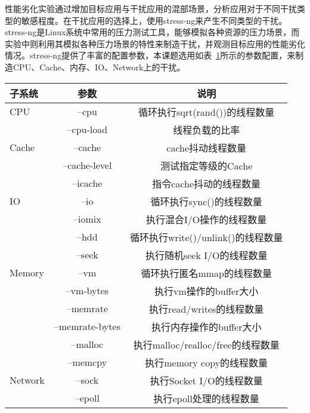 
性能劣化实验通过增加目标应用与干扰应用的混部场景，分析应用对于不同干扰类型的敏感程度。在干扰应用的选择上，使用stress-ng来产生不同类型的干扰。stress-ng是Linux系统中常用的压力测试工具，能够模拟各种资源的压力场景，而实验中则利用其模拟各种压力场景的特性来制造干扰，并观测目标应用的性能劣化情况。stress-ng提供了丰富的配置参数，本课题选用如表~\ref{tab:arg_list}所示的参数配置，来制造CPU、Cache、内存、IO、Network上的干扰。

\begin{table}
    \label{tab:arg_list}
    \footnotesize%
    \setlength{\tabcolsep}{4pt}%
    \renewcommand{\arraystretch}{1.5}%
    \centering
    \begin{tabular}{lcc}
        \hline
        子系统 & 参数 & 说明\\
        \hline
        CPU	    & --cpu & 循环执行sqrt(rand())的线程数量\\
	            & --cpu-load & 线程负载的比率\\
        Cache	& --cache & cache抖动线程数量\\
	            & --cache-level	&测试指定等级的Cache\\
	            & --icache	&指令cache抖动的线程数量\\
        IO	    & --io	&循环执行sync()的线程数量\\
	            & --iomix	&执行混合I/O操作的线程数量\\
	            & --hdd	&循环执行write()/unlink()的线程数量\\
	            & --seek	&执行随机seek I/O的线程数量\\
        Memory	& --vm	&循环执行匿名mmap的线程数量\\
	            & --vm-bytes	&执行vm操作的buffer大小\\
	            & --memrate	&执行read/writes的线程数量\\
	            & --memrate-bytes	&执行内存操作的buffer大小\\
	            & --malloc	&执行malloc/realloc/free的线程数量\\
	            & --memcpy	&执行memory copy的线程数量\\
        Network	& --sock	&执行Socket I/O的线程数量\\
	            & --epoll	&执行epoll处理的线程数量\\
        \hline
    \end{tabular}
\end{table}

